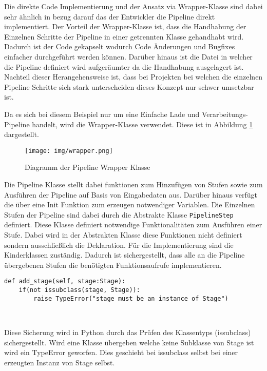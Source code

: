 \documentclass[a4paper]{article} %
\begin{document}
Die direkte Code Implementierung und der Ansatz via Wrapper-Klasse sind dabei sehr ähnlich in bezug darauf das der Entwickler die Pipeline direkt implementiert. Der Vorteil der Wrapper-Klasse ist, dass die Handhabung der Einzelnen Schritte der Pipeline in einer getrennten Klasse gehandhabt wird. Dadurch ist der Code gekapselt wodurch Code Änderungen und Bugfixes einfacher durchgeführt werden können. Darüber hinaus ist die Datei in welcher die Pipeline definiert wird aufgeräumter da die Handhabung ausgelagert ist. Nachteil dieser Herangehensweise ist, dass bei Projekten bei welchen die einzelnen Pipeline Schritte sich stark unterscheiden dieses Konzept nur schwer umsetzbar ist.

Da es sich bei diesem Beispiel nur um eine Einfache Lade und Verarbeitungs-Pipeline handelt, wird die Wrapper-Klasse verwendet. Diese ist in Abbildung \ref{fig:wrapper} dargestellt.

\begin{figure}[htbp] %
    \centering %
    \texttt{[image: img/wrapper.png]} %
    \caption{Diagramm der Pipeline Wrapper Klasse} %
    \label{fig:wrapper} %
\end{figure}

Die Pipeline Klasse stellt dabei funktionen zum Hinzufügen von Stufen sowie zum Ausführen der Pipeline auf Basis von Eingabedaten aus. Darüber hinaus verfügt die über eine Init Funktion zum erzeugen notwendiger Variablen. Die Einzelnen Stufen der Pipeline sind dabei durch die Abstrakte Klasse \texttt{PipelineStep} definiert. Diese Klasse definiert notwendige Funktionalitäten zum Ausführen einer Stufe. Dabei wird in der Abstrakten Klasse diese Funktionen nicht definiert sondern ausschließlich die Deklaration. Für die Implementierung sind die Kinderklassen zuständig. Dadurch ist sichergestellt, dass alle an die Pipeline übergebenen Stufen die benötigten Funktionsaufrufe implementieren.

\begin{verbatim}
def add_stage(self, stage:Stage):
    if(not issubclass(stage, Stage)):
        raise TypeError("stage must be an instance of Stage")
\end{verbatim}\

Diese Sicherung wird in Python durch das Prüfen des Klassentyps (issubclass) sichergestellt. Wird eine Klasse übergeben welche keine Subklasse von Stage ist wird ein TypeError geworfen. Dies geschieht bei issubclass selbst bei einer erzeugten Instanz von Stage selbst.
\end{document}
